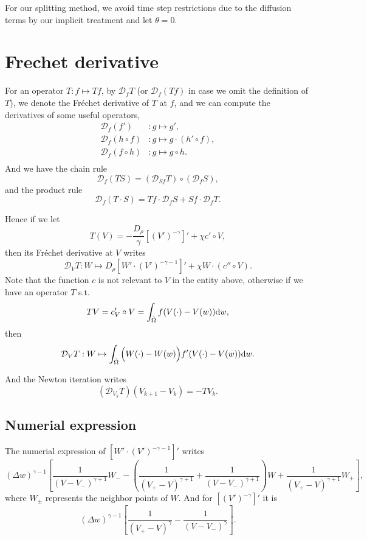 \documentclass{article}
\newcommand{\frender}{\mathcal D}
\begin{document}
  For our splitting method, we avoid time step restrictions due to the diffusion terms by our
  implicit treatment and let $\theta = 0$.

  \section{Frechet derivative}
  For an operator $T: f\mapsto Tf$, by $\frender_fT$ (or $\frender_f(Tf)$ in case we omit the definition
  of $T$), we denote the Fr\'echet derivative
  of $T$ at $f$, and we can compute the derivatives of some useful operators, 
  \[
    \begin{aligned}
      \frender_f(f')      &:g\mapsto g', \\
      \frender_f(h\circ f)&:g\mapsto g\cdot(h'\circ f), \\
      \frender_f(f\circ h)&:g\mapsto g\circ h. \\
    \end{aligned}
  \]
  And we have the chain rule
  \[
    \frender_f(TS) = \left(\frender_{Sf}T\right) \circ \left(\frender_fS\right),
  \]
  and the product rule
  \[
    \frender_f(T\cdot S) = Tf\cdot\frender_fS + Sf\cdot\frender_fT.
  \]

  Hence if we let
  \[
    T(V) = -\frac{D_\rho}{\gamma}\left[(V')^{-\gamma}\right]'
    + \chi c'\circ V,
  \]
  then its Fr\'echet derivative at $V$ writes
  \[
    \frender_V T: W\mapsto
    D_\rho\left[W'\cdot (V')^{-\gamma - 1}\right]' + \chi W\cdot(c''\circ V).
  \]
  Note that the function $c$ is not relevant to $V$ in the entity above,
  otherwise if we have an operator $T$ s.t.
  \[
    TV = c_V'\circ V = \int_{\tilde\Omega} f(V(\cdot) - V(w))\mathrm d w,
  \]
  then
  \[
    \frender_VT:W \mapsto \int_{\tilde\Omega}\Big(W(\cdot) - W(w)\Big)f'(V(\cdot) - V(w))\diff w.
  \]

  And the Newton iteration writes
  \[
    (\frender_{V_k} T)(V_{k + 1} - V_k) = - TV_k.
  \]

  \subsection{Numerial expression}
  The numerial expression of $[W'\cdot(V')^{-\gamma - 1}]'$ writes
  \[
    (\Delta w)^{\gamma - 1}
    \left[
      \frac{1}{(V - V_-)^{\gamma + 1}}W_-
      -\left(\frac{1}{(V_+ - V)^{\gamma + 1}} + \frac{1}{(V - V_-)^{\gamma + 1}}\right)W
      +\frac{1}{(V_+ - V)^{\gamma + 1}}W_+
    \right],
  \]
  where $W_{\pm}$ represents the neighbor points of $W$.
  And for $[(V')^{-\gamma}]'$ it is
  \[
    (\Delta w)^{\gamma - 1}
    \left[
      \frac1{(V_+ - V)^{\gamma}} - \frac1{(V - V_-)^\gamma}
    \right].
  \]
\end{document}
